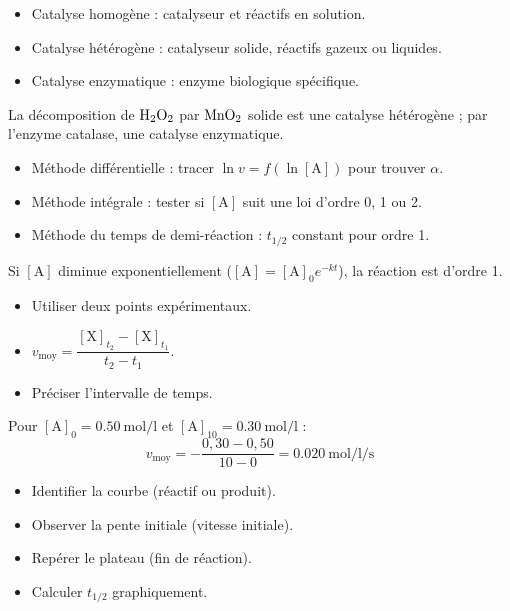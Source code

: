 \begin{itemize}
\item Catalyse homogène : catalyseur et réactifs en solution.
\item Catalyse hétérogène : catalyseur solide, réactifs gazeux ou liquides.
\item Catalyse enzymatique : enzyme biologique spécifique.
\end{itemize}

\begin{exemple}
La décomposition de $\ce{H2O2}$ par $\ce{MnO2}$ solide est une catalyse hétérogène ; par l'enzyme catalase, une catalyse enzymatique.
\end{exemple}

\begin{itemize}
\item Méthode différentielle : tracer $\ln v = f(\ln[\mathrm{A}])$ pour trouver $\alpha$.
\item Méthode intégrale : tester si $[\mathrm{A}]$ suit une loi d'ordre 0, 1 ou 2.
\item Méthode du temps de demi-réaction : $t_{1/2}$ constant pour ordre 1.
\end{itemize}

\begin{exemple}
Si $[\mathrm{A}]$ diminue exponentiellement ($[\mathrm{A}] = [\mathrm{A}]_0 e^{-kt}$), la réaction est d'ordre 1.
\end{exemple}

\begin{itemize}
\item Utiliser deux points expérimentaux.
\item $v_{\text{moy}} = \dfrac{[\mathrm{X}]_{t_2} - [\mathrm{X}]_{t_1}}{t_2 - t_1}$.
\item Préciser l'intervalle de temps.
\end{itemize}

\begin{exemple}
Pour $[\mathrm{A}]_0 = \SI{0,50}{\mol\per\litre}$ et $[\mathrm{A}]_{10} = \SI{0,30}{\mol\per\litre}$ :
\[
v_{\text{moy}} = -\frac{0,30-0,50}{10-0} = \SI{0,020}{\mol\per\litre\per\second}
\]
\end{exemple}

\begin{itemize}
\item Identifier la courbe (réactif ou produit).
\item Observer la pente initiale (vitesse initiale).
\item Repérer le plateau (fin de réaction).
\item Calculer $t_{1/2}$ graphiquement.
\end{itemize}

